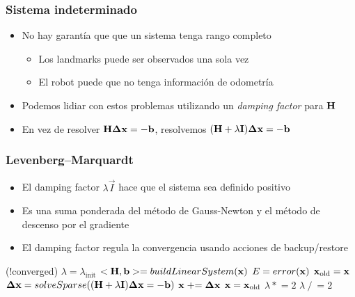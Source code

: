 \begin{frame}
    \frametitle{Sistema indeterminado}
    \begin{itemize}
		\item No hay garantía que que un sistema tenga rango completo
		\begin{itemize}
			\item Los landmarks puede ser observados una sola vez
			\item El robot puede que no tenga información de odometría
		\end{itemize}
		\item Podemos lidiar con estos problemas utilizando un \emph{damping factor} para $\boldsymbol{\mathbf{H}}$
		\item En vez de resolver $\boldsymbol{\mathbf{H}} \boldsymbol{\mathbf{\Delta}} \boldsymbol{\mathbf{x}} = - \boldsymbol{\mathbf{b}}$, resolvemos
		$(\boldsymbol{\mathbf{H}} + \lambda \boldsymbol{\mathbf{I}}) \boldsymbol{\mathbf{\Delta}} \boldsymbol{\mathbf{x}} = - \boldsymbol{\mathbf{b}}$
    \end{itemize}
\end{frame}

\begin{frame}
    \frametitle{Levenberg–Marquardt}
    
    \footnotesize
    
    \begin{itemize}
		\item El damping factor $\lambda \vec{I}$ hace que el sistema sea definido positivo
		\item Es una suma ponderada del método de Gauss-Newton y el método de descenso por el gradiente
		\item El damping factor regula la convergencia usando acciones de backup/restore
    \end{itemize}

	\begin{algorithmic}[1]
		 
		\While (!converged)
		\State $\lambda =  \lambda_{\textrm{init}}$
		\State $<\boldsymbol{\mathbf{H}}, \boldsymbol{\mathbf{b}}> = buildLinearSystem(\boldsymbol{\mathbf{x}})$
		\State $E = error(\boldsymbol{\mathbf{x}})$
		\State $\boldsymbol{\mathbf{x}}_{\textrm{old}} = \boldsymbol{\mathbf{x}}$
		\State $\boldsymbol{\mathbf{\Delta}}\boldsymbol{\mathbf{x}} = solveSparse((\boldsymbol{\mathbf{H}} + \lambda \boldsymbol{\mathbf{I}}) \boldsymbol{\mathbf{\Delta}} \boldsymbol{\mathbf{x}} = - \boldsymbol{\mathbf{b}})$
		\State $\boldsymbol{\mathbf{x}} \mathrel{+}= \boldsymbol{\mathbf{\Delta}}\boldsymbol{\mathbf{x}}$
		\State $\boldsymbol{\mathbf{x}} = \boldsymbol{\mathbf{x}}_{\textrm{old}}$
		\State $\lambda \mathrel{*}= 2$
		\Else
		\State $\lambda \mathrel{/}= 2$
		\EndIf
		\EndWhile
		\EndProcedure
	\end{algorithmic}

\end{frame}



